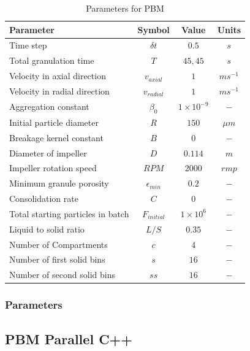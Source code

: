 \documentclass[preprint,11pt,authoryear]{elsarticle}
\begin{document}
\begin{table}[!htb]
\caption{Parameters for PBM}
\label{table:mthds_pbm_parameters}
\begin{center}
\begin{tabular}{l|c|c|c}
\hline
\bf{Parameter} &\bf{Symbol} &\bf{Value} &\bf{Units}\\
\hline
Time step & $\delta t$ & $0.5$ & $s$\\
Total granulation time & $T$ & $45, 45$ & $s$\\
Velocity in axial direction & $v_{axial}$ & $1$ & $ms^{-1}$\\
Velocity in radial direction & $v_{radial}$ & $1$ & $ms^{-1}$\\
Aggregation constant & $\beta_0$ & $1\times10^{-9}$ & $-$\\
Initial particle diameter & $R$ & $150$ & $\mu m$\\
Breakage kernel constant & $B$ & $0$ & $-$\\
Diameter of impeller & $D$ & $0.114$ & $m$ \\
Impeller rotation speed & $RPM$ & $2000$ & $rmp$\\
Minimum granule porosity & $\epsilon_{min}$ & $0.2$ & $-$\\
Consolidation rate & $C$ & $0$ & $-$\\
Total starting particles in batch & $F_{initial}$ & $1 \times 10^{6}$ & $-$\\
Liquid to solid ratio & $L/S$ & $0.35$ & $-$ \\
Number of Compartments & $c$ & $4$ & $-$ \\
Number of first solid bins & $s$ & $16$ & $-$\\
Number of second solid bins & $ss$ & $16$ & $-$\\
\hline
\end{tabular}
\end{center}
\end{table}

\subsubsection{Parameters}


\subsection{PBM Parallel C++}
\end{document}
